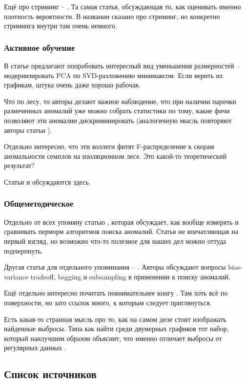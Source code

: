 \documentclass[12pt]{article}
\begin{document}
Ещё про стриминг --
\cite{wuRSForestRapidDensity2014}
. Та самая статья, обсуждающая то, как оценивать именно плотность вероятности.
В названии сказано про стриминг, но конкретно стриминга внутри там очень немного.


\subsubsection*{Активное обучение}

В статье
\cite{pugginiEnhancedVariableSelection2018}
предлагают попробовать интересный вид
уменьшения размерностей -- модернизировать PCA по SVD-разложению минимаксом.
Если верить их графикам, штука очень даже хорошо рабочая.

Что по лесу, то 
авторы делают важное наблюдение, что при наличии парочки размеченных аномалий уже
можно собрать статистики по тому, какие фичи позволяют эти аномалии дискриминировать
(аналогичную мысль повторяют авторы статьи
\cite{gavaiDetectingInsiderThreat2015}
).

Отдельно интересно, что эти коллеги фитят F-распределение к скорам аномальности
семплов на изоляционном лесе. Это какой-то теоретический результат?

Статьи
\cite{siddiquiFeedbackGuidedAnomalyDiscovery2018}
и
\cite{dasIncorporatingExpertFeedback}
обсуждаются здесь.


\subsubsection*{Общеметодическое}

Отдельно от всех упомяну статью
\cite{camposEvaluationUnsupervisedOutlier2016}
, которая обсуждает, как вообще измерять и сравнивать перморм алгоритмов поиска
аномалий. Статья не впечатляющая на первый взгляд, но возможно что-то полезное
для наших дел можно оттуда подчерпнуть.

Другая статья для отдельного упоминания --
\cite{aggarwalTheoreticalFoundationsAlgorithms2015}
. Авторы обсуждают вопросы bias-variance tradeoff, bagging и subsampling в применении
к поиску аномалий.

Ещё отдельно интересно почитать повнимательнее книгу
\cite{aggarwalOutlierEnsembles2017}
. Там хоть всё по поверхности, но зато ссылок много, к которым следует приглянуться.

Есть какая-то странная мысль про то, как на самом деле стоит изображать найденные выбросы.
Типа как найти среди двумерных графиков тот набор, который наилучшим образом объяснит, что именно отличает выбросы от регулярных данных
\cite{guptaOutlierDetectionLookOut2019}
.

\subsection*{Список источников}
\printbibliography[heading=none]
\end{document}
